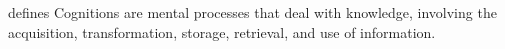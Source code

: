 \documentclass[a4paper]{article}
\title{}
\date{}
\begin{document}
    \maketitle
    
    \cite{revlin-2012-cognition-theory-and-practice} defines Cognitions are mental processes that deal with knowledge, involving the acquisition, transformation, storage, retrieval, and use of information.
\end{document}
